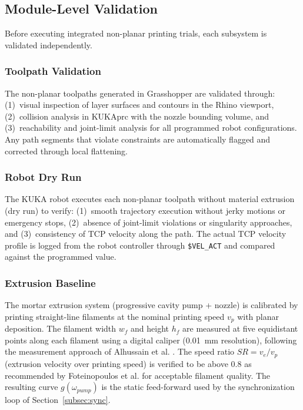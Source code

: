 \documentclass[conference]{IEEEtran}
\begin{document}
\subsection{Module-Level Validation}
\label{subsec:validation}

Before executing integrated non-planar printing trials, each subsystem is validated independently.

\subsubsection{Toolpath Validation}

The non-planar toolpaths generated in Grasshopper are validated through: (1)~visual inspection of layer surfaces and contours in the Rhino viewport, (2)~collision analysis in KUKA\textbar prc with the nozzle bounding volume, and (3)~reachability and joint-limit analysis for all programmed robot configurations. Any path segments that violate constraints are automatically flagged and corrected through local flattening.

\subsubsection{Robot Dry Run}

The KUKA robot executes each non-planar toolpath without material extrusion (dry run) to verify: (1)~smooth trajectory execution without jerky motions or emergency stops, (2)~absence of joint-limit violations or singularity approaches, and (3)~consistency of TCP velocity along the path. The actual TCP velocity profile is logged from the robot controller through \texttt{\$VEL\_ACT} and compared against the programmed value.

\subsubsection{Extrusion Baseline}
\label{subsubsec:extrusion-baseline}

The mortar extrusion system (progressive cavity pump + nozzle) is calibrated by printing straight-line filaments at the nominal printing speed $v_p$ with planar deposition. The filament width $w_f$ and height $h_f$ are measured at five equidistant points along each filament using a digital caliper (0.01~mm resolution), following the measurement approach of Alhussain et al. \cite{alhussain_developing_2024}. The speed ratio $SR = v_e / v_p$ (extrusion velocity over printing speed) is verified to be above 0.8 as recommended by Foteinopoulos et al. \cite{foteinopoulos_cement-based_2020} for acceptable filament quality. The resulting curve $g(\omega_{pump})$ is the static feed-forward used by the synchronization loop of Section~\ref{subsec:sync}.
\end{document}
